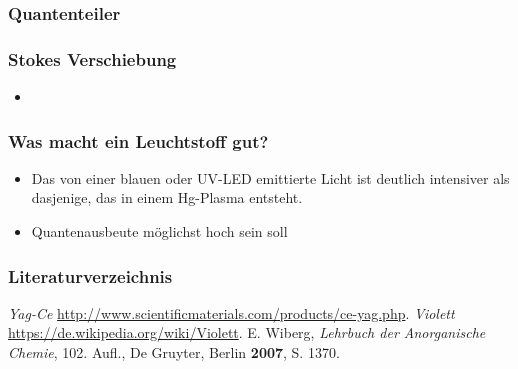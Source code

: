 \documentclass{beamer}
\begin{document}
  \begin{frame}
  \frametitle{Quantenteiler}
 
  \end{frame}

\begin{frame}
  \frametitle{Stokes Verschiebung}
    \begin{itemize}
    \item 
    \end{itemize}
  \end{frame}


\begin{frame}[t]\frametitle{Was macht ein Leuchtstoff gut?}
\begin{itemize}
 \item \footnotesize Das von einer blauen oder UV-LED emittierte Licht ist
deutlich intensiver als dasjenige, das in einem Hg-Plasma
entsteht. 
 \item \footnotesize Quantenausbeute möglichst hoch sein soll
\end{itemize}
\end{frame}



\begin{frame}[t]\frametitle{Literaturverzeichnis}
    

\begin{thebibliography}{9}
\emph{Yag-Ce}
 \url{http://www.scientificmaterials.com/products/ce-yag.php}.
\emph{Violett}
 \url{https://de.wikipedia.org/wiki/Violett}.
E. Wiberg, \emph{Lehrbuch der Anorganische Chemie}, 102. Aufl., De Gruyter, Berlin \textbf{2007}, S. 1370.
\end{thebibliography}
  
\end{frame}


\end{document}
